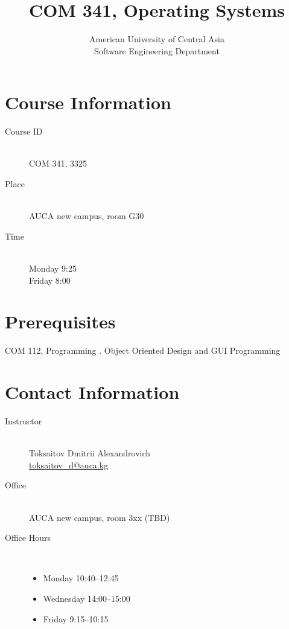 \documentclass[12pt,a4paper,oneside]{article}
\begin{document}
    \title{COM 341, Operating Systems}
    \author{
        American University of Central Asia\\
        Software Engineering Department
    }
    \date{}
    \maketitle

    \section{Course Information}

        \begin{description}
            \item[Course ID]\hfill\\
                COM 341, 3325
            \item[Place]\hfill\\
                AUCA new campus, room G30
            \item[Time]\hfill\\
                Monday 9:25\\
                Friday 8:00
        \end{description}

    \section{Prerequisites}

        COM 112, Programming \uppercase\expandafter{\relax}. Object Oriented Design and GUI Programming

        \section{Contact Information}

            \begin{description}
                \item[Instructor]\hfill\\
                    Toksaitov Dmitrii Alexandrovich\\
                    \href{mailto:toksaitov_d@auca.kg}{toksaitov\_d@auca.kg}
                \item[Office]\hfill\\
                    AUCA new campus, room 3xx (TBD)
                \item[Office Hours]\hfill\\
                    \begin{itemize}
                        \item Monday 10:40--12:45
                        \item Wednesday 14:00--15:00
                        \item Friday 9:15--10:15
                    \end{itemize}
        \end{description}
\end{document}
